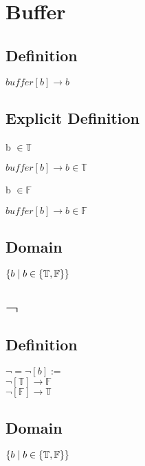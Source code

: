 \documentclass[11pt]{article}
\begin{document}
\section{Buffer}
\subsection{Definition}
\vspace{2mm}
\begin{center}
$
buffer[b] \rightarrow b
$
\end{center}
\subsection{Explicit Definition}
\vspace{2mm}
b $\in \mathbb{T}$
\begin{center}
$
buffer[b] \rightarrow b \in \mathbb{T}
$
\end{center}
b $\in \mathbb{F}$
\begin{center}
$
buffer[b] \rightarrow b \in \mathbb{F}
$
\end{center}
\subsection{Domain}
\begin{center}
$
\{ b \hspace{1mm}| \hspace{1mm} b \in \{\mathbb{T}, \mathbb{F}\}\}
$
\end{center}

\section{$\lnot$}
\subsection{Definition}
\begin{center}
$
\lnot = \lnot[b] :=
$
\\ \vspace{2mm}
$
 \lnot[\mathbb{T}] \rightarrow \mathbb{F}
 $
 \\ \vspace{2mm}
 $
 \lnot[\mathbb{F}] \rightarrow \mathbb{T}
$
\end{center}
\subsection{Domain}
\begin{center}
$
\{ b \hspace{1mm}| \hspace{1mm} b \in \{\mathbb{T}, \mathbb{F}\}\}
$
\end{center}
\end{document}

